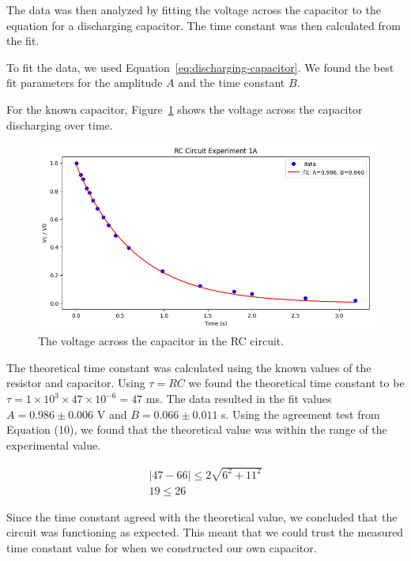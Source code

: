 \documentclass[11pt]{article}
\begin{document}
    The data was then analyzed by fitting the voltage across the capacitor to the equation for a discharging capacitor.
    The time constant was then calculated from the fit.

    To fit the data, we used Equation~\ref{eq:discharging-capacitor}.
    We found the best fit parameters for the amplitude $A$ and the time constant $B$.

    For the known capacitor, Figure~\ref{fig:part1a_graph} shows the voltage across the capacitor discharging over time.

    \begin{figure}[H]
        \includegraphics[width=1.0\linewidth]{resources/images/rc part 1a graph}
        \caption{The voltage across the capacitor in the RC circuit.}
        \label{fig:part1a_graph}
    \end{figure}

    The theoretical time constant was calculated using the known values of the resistor and capacitor.
    Using $\tau = RC$ we found the theoretical time constant to be $\tau = 1 \times 10^{3} \times 47 \times 10^{-6} = 47$ ms.
    The data resulted in the fit values $A = 0.986 \pm 0.006$ V and $B = 0.066 \pm 0.011$ s.
    Using the agreement test from Equation (10), we found that the theoretical value was within the range of the experimental value.

    \begin{e}
        \begin{align*}
        |47 - 66| \le2 \sqrt{6^2 + 11^2} \\
        19 \le 26
        \end{align*}
    \end{e}

    Since the time constant agreed with the theoretical value, we concluded that the circuit was functioning as expected.
    This meant that we could trust the measured time constant value for when we constructed our own capacitor.
\end{document}

